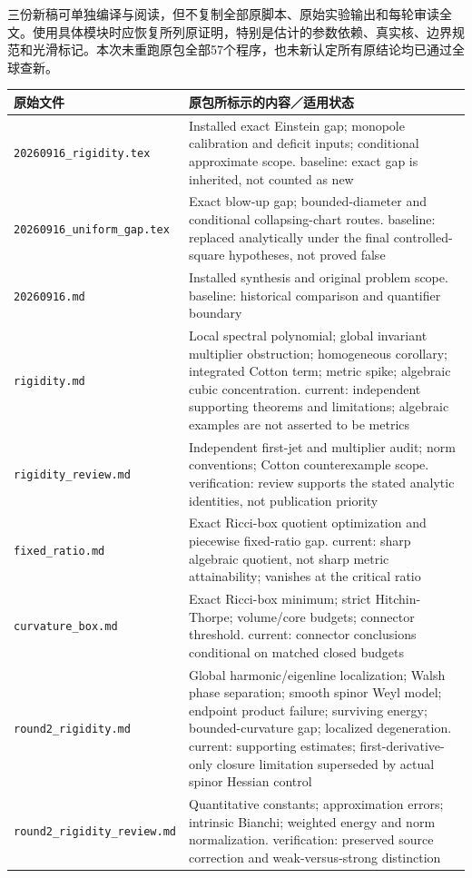 \documentclass[UTF8,fontset=fandol,zihao=-4]{ctexart}
\theoremstyle{cn}
\begin{document}
三份新稿可单独编译与阅读，但不复制全部原脚本、原始实验输出和每轮审读全文。使用具体模块时应恢复所列原证明，特别是估计的参数依赖、真实核、边界规范和光滑标记。本次未重跑原包全部57个程序，也未新认定所有原结论均已通过全球查新。

\small
\begin{longtable}{L{.34\textwidth}L{.59\textwidth}}
\toprule 原始文件 & 原包所标示的内容／适用状态\\\midrule\endhead
\nolinkurl{20260916_rigidity.tex} & Installed exact Einstein gap; monopole calibration and deficit inputs; conditional approximate scope. baseline: exact gap is inherited, not counted as new\\
\nolinkurl{20260916_uniform_gap.tex} & Exact blow-up gap; bounded-diameter and conditional collapsing-chart routes. baseline: replaced analytically under the final controlled-square hypotheses, not proved false\\
\nolinkurl{20260916.md} & Installed synthesis and original problem scope. baseline: historical comparison and quantifier boundary\\
\nolinkurl{rigidity.md} & Local spectral polynomial; global invariant multiplier obstruction; homogeneous corollary; integrated Cotton term; metric spike; algebraic cubic concentration. current: independent supporting theorems and limitations; algebraic examples are not asserted to be metrics\\
\nolinkurl{rigidity_review.md} & Independent first-jet and multiplier audit; norm conventions; Cotton counterexample scope. verification: review supports the stated analytic identities, not publication priority\\
\nolinkurl{fixed_ratio.md} & Exact Ricci-box quotient optimization and piecewise fixed-ratio gap. current: sharp algebraic quotient, not sharp metric attainability; vanishes at the critical ratio\\
\nolinkurl{curvature_box.md} & Exact Ricci-box minimum; strict Hitchin-Thorpe; volume/core budgets; connector threshold. current: connector conclusions conditional on matched closed budgets\\
\nolinkurl{round2_rigidity.md} & Global harmonic/eigenline localization; Walsh phase separation; smooth spinor Weyl model; endpoint product failure; surviving energy; bounded-curvature gap; localized degeneration. current: supporting estimates; first-derivative-only closure limitation superseded by actual spinor Hessian control\\
\nolinkurl{round2_rigidity_review.md} & Quantitative constants; approximation errors; intrinsic Bianchi; weighted energy and norm normalization. verification: preserved source correction and weak-versus-strong distinction\\

\end{longtable}
\end{document}
